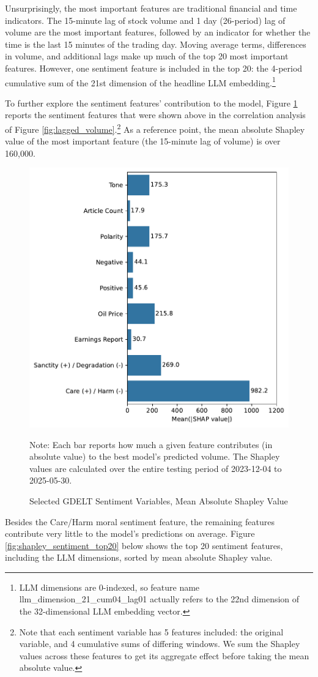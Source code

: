 \documentclass[12pt]{article}
\begin{document}
Unsurprisingly, the most important features are traditional financial and time indicators. The 15-minute lag of stock volume and 1 day (26-period) lag of volume are the most important features, followed by an indicator for whether the time is the last 15 minutes of the trading day. Moving average terms, differences in volume, and additional lags make up much of the top 20 most important features. However, one sentiment feature is included in the top 20: the 4-period cumulative sum of the 21st dimension of the headline LLM embedding.\footnote{LLM dimensions are 0-indexed, so feature name llm\_dimension\_21\_cum04\_lag01 actually refers to the 22nd dimension of the 32-dimensional LLM embedding vector.}

To further explore the sentiment features' contribution to the model, Figure \ref{fig:shapley_sentiment} reports the sentiment features that were shown above in the correlation analysis of Figure \ref{fig:lagged_volume}.\footnote{Note that each sentiment variable has 5 features included: the original variable, and 4 cumulative sums of differing windows. We sum the Shapley values across these features to get its aggregate effect before taking the mean absolute value.} As a reference point, the mean absolute Shapley value of the most important feature (the 15-minute lag of volume) is over 160,000.
\begin{figure}[H]
    \centering
    \caption{Selected GDELT Sentiment Variables, Mean Absolute Shapley Value}
    \includegraphics[width=0.75\linewidth]{../Output/shap_abs_sentiment.pdf}
    \begin{minipage}{0.75\linewidth}
        \footnotesize
        \singlespacing
        Note: Each bar reports how much a given feature contributes (in absolute value) to the best model's predicted volume. The Shapley values are calculated over the entire testing period of 2023-12-04 to 2025-05-30.
    \end{minipage}
    \label{fig:shapley_sentiment}
\end{figure}
Besides the Care/Harm moral sentiment feature, the remaining features contribute very little to the model's predictions on average. Figure \ref{fig:shapley_sentiment_top20} below shows the top 20 sentiment features, including the LLM dimensions, sorted by mean absolute Shapley value.
\end{document}
